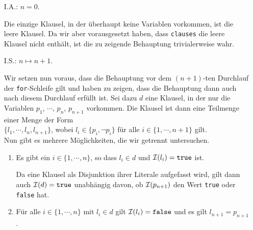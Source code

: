 \begin{enumerate}
\item[I.A.:] $n = 0$.

             Die einzige Klausel, in der \"{u}berhaupt keine Variablen vorkommen, ist die leere Klausel.
             Da wir aber vorausgesetzt haben, dass \texttt{clauses} die leere Klausel nicht enth\"{a}lt,
             ist die zu zeigende Behauptung trivialerweise wahr.
\item[I.S.:] $n \mapsto n+1$.

             Wir setzen nun voraus, dass die Behauptung vor dem $(n\!+\!1)$-ten Durchlauf der
             \texttt{for}-Schleife gilt und haben zu zeigen, dass die Behauptung dann auch nach
             diesem Durchlauf erf\"{u}llt ist.  Sei dazu $d$ eine Klausel, in der nur die Variablen
             $p_1$, $\cdots$, $p_n$, $p_{n+1}$ vorkommen.  Die Klausel ist dann eine Teilmenge einer
             Menge der Form
             \\[0.2cm]
             \hspace*{1.3cm}
             $\{ l_1, \cdots, l_n, l_{n+1} \}$, \quad wobei $l_i \in \{ p_i, \neg p_i \}$ f\"{u}r alle
             $i \in \{1,\cdots, n+1\}$ gilt.
             \\[0.2cm]
             Nun gibt es mehrere M\"{o}glichkeiten, die wir getrennt untersuchen.
             \begin{enumerate}
             \item Es gibt ein $i \in \{1,\cdots,n\}$, so dass $l_i \in d$ und  $\mathcal{I}(l_i) =
               \texttt{true}$ ist.  

                   Da eine Klausel als Disjunktion ihrer Literale aufgefasst wird, gilt dann auch
                   $\mathcal{I}(d) = \texttt{true}$ unabh\"{a}ngig davon, ob $\mathcal{I}(p_{n+1})$ den Wert \texttt{true} oder
                   \texttt{false} hat.
             \item F\"{u}r alle $i \in \{1,\cdots,n\}$ mit $l_i \in d$ gilt $\mathcal{I}(l_i) = \texttt{false}$ und es gilt $l_{n+1} = p_{n+1}$.
                   

\end{enumerate}
\end{enumerate}

